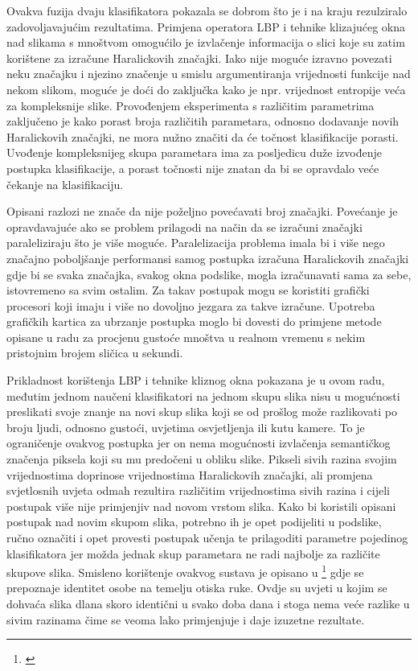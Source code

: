 \documentclass[times, utf8, zavrsni]{fer}
\begin{document}
\bigbreak

Ovakva fuzija dvaju klasifikatora pokazala se dobrom što je i na kraju rezulziralo zadovoljavajućim
rezultatima. Primjena operatora LBP i tehnike klizajućeg okna nad slikama s mnoštvom omogućilo je 
izvlačenje informacija o slici koje su zatim korištene za izračune Haralickovih značajki. Iako nije moguće 
izravno povezati neku značajku i njezino značenje u smislu argumentiranja vrijednosti funkcije
nad nekom slikom, moguće je doći do zaključka kako je npr. vrijednost entropije veća za kompleksnije slike.
Provođenjem eksperimenta s različitim parametrima zaključeno je kako porast broja različitih 
parametara, odnosno dodavanje novih Haralickovih značajki, ne mora nužno značiti da će točnost
klasifikacije porasti. Uvođenje kompleksnijeg skupa parametara ima za posljedicu duže izvođenje
postupka klasifikacije, a porast točnosti nije znatan da bi se opravdalo veće čekanje na klasifikaciju.

\bigbreak 

Opisani razlozi ne znače da nije poželjno povećavati broj značajki. Povećanje je opravdavajuće
ako se problem prilagodi na način da se izračuni značajki paraleliziraju što je više moguće. 
Paralelizacija problema imala bi i više nego značajno poboljšanje performansi samog postupka
izračuna Haralickovih značajki gdje bi se svaka značajka, svakog okna podslike, mogla izračunavati sama 
za sebe, istovremeno sa svim ostalim. Za takav postupak mogu se koristiti grafički procesori
koji imaju i više no dovoljno jezgara za takve izračune. Upotreba grafičkih kartica za ubrzanje
postupka moglo bi dovesti do primjene metode opisane u radu za procjenu gustoće mnoštva 
u realnom vremenu s nekim pristojnim brojem sličica u sekundi.

\bigbreak

Prikladnost korištenja LBP i tehnike kliznog okna pokazana je u ovom radu, međutim jednom
naučeni klasifikatori na jednom skupu slika nisu u mogućnosti preslikati svoje znanje
na novi skup slika koji se od prošlog može razlikovati po broju ljudi, odnosno gustoći,
uvjetima osvjetljenja ili kutu kamere. To je ograničenje ovakvog postupka jer on 
nema mogućnosti izvlačenja semantičkog značenja piksela koji su mu predočeni 
u obliku slike. Pikseli sivih razina  svojim vrijednostima doprinose vrijednostima Haralickovih 
značajki, ali promjena svjetlosnih uvjeta odmah rezultira različitim vrijednostima sivih
razina i cijeli postupak više nije primjenjiv nad novom vrstom slika. Kako bi koristili 
opisani postupak nad novim skupom slika, potrebno ih je opet podijeliti u podslike, 
ručno označiti i opet provesti postupak učenja te prilagoditi parametre pojedinog klasifikatora
jer možda jednak skup parametara ne radi najbolje za različite skupove slika. 
Smisleno korištenje ovakvog sustava je opisano u \footnote{\cite{1512051}} gdje
se prepoznaje identitet osobe na temelju otiska ruke. Ovdje su uvjeti u kojim se 
dohvaća slika dlana skoro identični u svako doba dana i stoga nema veće razlike
u sivim razinama čime se veoma lako primjenjuje i daje izuzetne rezultate.
\end{document}
